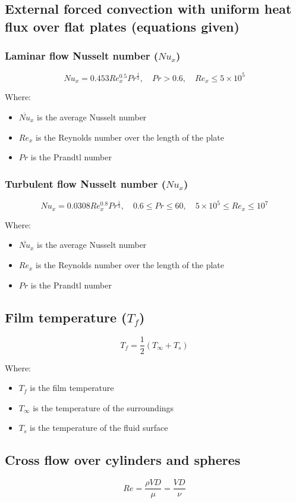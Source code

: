 \documentclass[11pt]{article}
\begin{document}
\subsection{External forced convection with uniform heat flux over flat plates (equations given)}
\label{sec:orgf1e724e}

\subsubsection{Laminar flow Nusselt number (\(Nu_x\))}
\label{sec:org6f9d3a9}
\[Nu_x = 0.453 Re_x^{0.5} Pr^{\frac{1}{3}}, \quad Pr > 0.6, \quad Re_x \le 5 \times 10^5\]

Where:
\begin{itemize}
\item \(\overline{Nu}_x\) is the average Nusselt number
\item \(Re_x\) is the Reynolds number over the length of the plate
\item \(Pr\) is the Prandtl number
\end{itemize}
\subsubsection{Turbulent flow Nusselt number (\(Nu_x\))}
\label{sec:org3906790}
\[Nu_x = 0.0308 Re_x^{0.8} Pr^{\frac{1}{3}}, \quad 0.6 \le Pr \le 60, \quad 5 \times 10^5 \le Re_x \le 10^7\]

Where:
\begin{itemize}
\item \(\overline{Nu}_x\) is the average Nusselt number
\item \(Re_x\) is the Reynolds number over the length of the plate
\item \(Pr\) is the Prandtl number
\end{itemize}
\subsection{Film temperature (\(T_f\))}
\label{sec:orgc7f86ef}
\[T_f = \frac{1}{2} (T_{\infty} + T_s)\]

Where:
\begin{itemize}
\item \(T_f\) is the film temperature
\item \(T_{\infty}\) is the temperature of the surroundings
\item \(T_s\) is the temperature of the fluid surface
\end{itemize}
\subsection{Cross flow over cylinders and spheres}
\label{sec:org32ff4cb}
\[Re = \frac{\rho VD}{\mu} = \frac{VD}{\nu}\]
\end{document}

